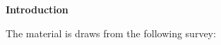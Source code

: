 \begin{frame}\begin{center}
	\LARGE\textbf{Introduction}
\end{center}\end{frame}
\begin{frame}

The material is draws from the following survey:
\cite{Rubinstein.2006}
\end{frame}

